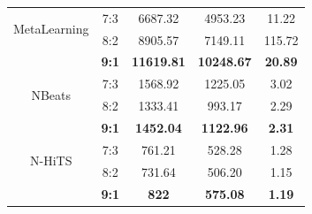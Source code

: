 \begin{table}[H]
\begin{tabular}{|c|c|c|c|c|}
         \hline
         \multirow{2}{*}{MetaLearning} & 7:3 & 6687.32&4953.23&11.22\\ & 8:2 & 8905.57&7149.11&115.72 \\ & \textbf{9:1} & \textbf{11619.81} & \textbf{10248.67} & \textbf{20.89}\\
         \hline
         \multirow{2}{*}{NBeats} & 7:3 & 1568.92&1225.05&3.02\\ & 8:2 & 1333.41&993.17&2.29 \\ & \textbf{9:1} & \textbf{1452.04} & \textbf{1122.96} & \textbf{2.31}\\
         \hline
         \multirow{2}{*}{N-HiTS} & 7:3 & 761.21&528.28&1.28\\ & 8:2 & 731.64&506.20&1.15 \\ & \textbf{9:1} & \textbf{822} & \textbf{575.08} & \textbf{1.19}\\
         \hline
    \end{tabular}
    \label{bidvresult}
\end{table}

